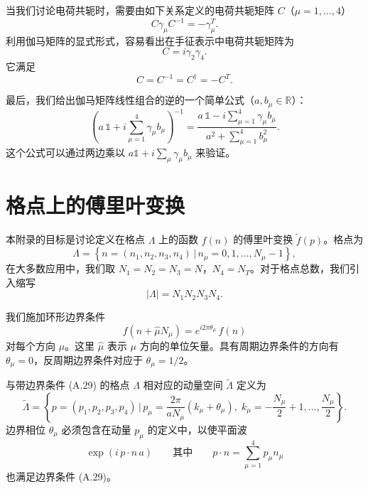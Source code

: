 当我们讨论电荷共轭时，需要由如下关系定义的电荷共轭矩阵 $C$（$\mu = 1, \ldots, 4$）
\begin{equation}
  C\gamma_\mu C^{-1} = -\gamma_\mu^T .
\end{equation}
利用伽马矩阵的显式形式，容易看出在手征表示中电荷共轭矩阵为
\begin{equation}
  C = i\gamma_2\gamma_4 .
\end{equation}
它满足
\begin{equation}
  C = C^{-1} = C^\dagger = -C^T .
\end{equation}

最后，我们给出伽马矩阵线性组合的逆的一个简单公式（$a, b_\mu \in \mathbb{R}$）：
\begin{equation}
  \left( a\,\mathbb{1} + i\sum_{\mu=1}^{4}\gamma_\mu b_\mu \right)^{-1}
  = \frac{ a\,\mathbb{1} - i\sum_{\mu=1}^{4}\gamma_\mu b_\mu }{ a^2 + \sum_{\mu=1}^{4}b_\mu^2 }.
\end{equation}
这个公式可以通过两边乘以 $a\mathbb{1} + i\sum_\mu \gamma_\mu b_\mu$ 来验证。

\section{格点上的傅里叶变换}

本附录的目标是讨论定义在格点 $\Lambda$ 上的函数 $f(n)$ 的傅里叶变换 $\tilde{f}(p)$。格点为
\begin{equation}
  \Lambda = \left\{ n = (n_1, n_2, n_3, n_4) \,\big|\, n_\mu = 0, 1, \ldots, N_\mu - 1 \right\},
\end{equation}
在大多数应用中，我们取 $N_1 = N_2 = N_3 = N$，$N_4 = N_T$。对于格点总数，我们引入缩写
\begin{equation}
  |\Lambda| = N_1 N_2 N_3 N_4 .
\end{equation}

我们施加环形边界条件
\begin{equation}
  f(n + \hat{\mu}N_\mu) = e^{i 2\pi\theta_\mu}\, f(n)
\end{equation}
对每个方向 $\mu$。这里 $\hat{\mu}$ 表示 $\mu$ 方向的单位矢量。具有周期边界条件的方向有 $\theta_\mu = 0$，反周期边界条件对应于 $\theta_\mu = 1/2$。

与带边界条件 (A.29) 的格点 $\Lambda$ 相对应的动量空间 $\tilde{\Lambda}$ 定义为
\begin{equation}
  \tilde{\Lambda} = \left\{ p = (p_1, p_2, p_3, p_4) \,\Big|\, p_\mu =
  \frac{2\pi}{aN_\mu}(k_\mu + \theta_\mu),\; k_\mu = -\frac{N_\mu}{2} + 1, \ldots, \frac{N_\mu}{2} \right\}.
\end{equation}
边界相位 $\theta_\mu$ 必须包含在动量 $p_\mu$ 的定义中，以使平面波
\begin{equation}
  \exp(i\,p\cdot n\,a) \qquad \text{其中} \qquad p\cdot n = \sum_{\mu=1}^{4}p_\mu n_\mu
\end{equation}
也满足边界条件 (A.29)。

